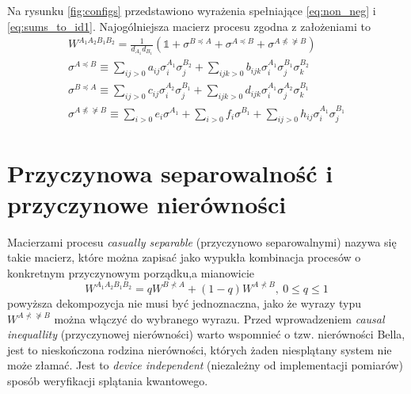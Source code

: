 \documentclass[10pt]{article} %
\newcommand{\WAll}{W^{A_1A_2B_1B_2}}
\begin{document}
Na rysunku \ref{fig:configs} przedstawiono wyrażenia spełniające \eqref{eq:non_neg} i \eqref{eq:sums_to_id1}. Najogólniejsza macierz procesu zgodna z założeniami to
\begin{gather}
\WAll = \frac{1}{d_{A_1}d_{B_1}}(\mathbb{1} +\sigma^{B \preceq A} + \sigma^{A \preceq B} + \sigma^{A \npreceq \nsucceq B}) \\
\sigma^{A \preceq B} \equiv \sum_{ij>0} a_{ij} \sigma^{A_1}_i \sigma^{B_2}_j + \sum_{ijk>0} b_{ijk} \sigma^{A_1}_i \sigma^{B_1}_j \sigma^{B_2}_k \\
\sigma^{B \preceq A} \equiv \sum_{ij>0} c_{ij} \sigma^{A_2}_i \sigma^{B_1}_j + \sum_{ijk>0} d_{ijk} \sigma^{A_1}_i \sigma^{A_2}_j \sigma^{B_1}_k \\
 \sigma^{A \npreceq \nsucceq B} \equiv \sum_{i>0} e_i  \sigma^{A_1} + \sum_{i>0} f_i  \sigma^{B_1} + \sum_{ij>0} h_{ij} \sigma^{A_1}_i \sigma^{B_1}_j
\end{gather}
\section{Przyczynowa separowalność i przyczynowe nierówności}
Macierzami procesu \textit{casually separable} (przyczynowo separowalnymi) nazywa się takie macierz, które można zapisać jako wypukła kombinacja procesów o konkretnym przyczynowym porządku,a mianowicie
\begin{equation}
\label{eq:sep}
\WAll = qW^{B \nprec A} + (1-q)W^{A \nprec B},~0 \leq q \leq 1
\end{equation}
powyższa dekompozycja nie musi być jednoznaczna, jako że wyrazy typu $W^{A \nprec \nsucceq B}$ można włączyć do wybranego wyrazu.
Przed wprowadzeniem \textit{causal inequallity} (przyczynowej nierówności) warto wspomnieć o tzw. nierówności Bella, jest to nieskończona rodzina nierówności, których żaden niesplątany system nie może złamać. Jest to \textit{device independent} (niezależny od implementacji pomiarów) sposób weryfikacji splątania kwantowego.
\end{document}
